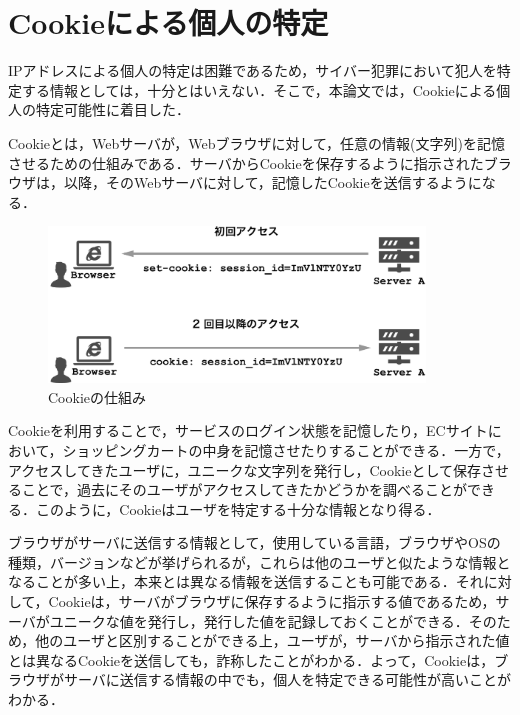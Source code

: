 \documentclass[10pt, a4paper]{jreport}
\begin{document}

\section{Cookieによる個人の特定}
IPアドレスによる個人の特定は困難であるため，サイバー犯罪において犯人を特定する情報としては，十分とはいえない．そこで，本論文では，Cookieによる個人の特定可能性に着目した．

Cookieとは，Webサーバが，Webブラウザに対して，任意の情報(文字列)を記憶させるための仕組みである．サーバからCookieを保存するように指示されたブラウザは，以降，そのWebサーバに対して，記憶したCookieを送信するようになる．

\begin{figure}[H]
	\begin{center}
		\includegraphics[width=100mm]{figures/cookie.pdf}
	\end{center}
	\caption{Cookieの仕組み}
	\label{fig: cookie}
\end{figure}

Cookieを利用することで，サービスのログイン状態を記憶したり，ECサイトにおいて，ショッピングカートの中身を記憶させたりすることができる．一方で，アクセスしてきたユーザに，ユニークな文字列を発行し，Cookieとして保存させることで，過去にそのユーザがアクセスしてきたかどうかを調べることができる．このように，Cookieはユーザを特定する十分な情報となり得る．

ブラウザがサーバに送信する情報として，使用している言語，ブラウザやOSの種類，バージョンなどが挙げられるが，これらは他のユーザと似たような情報となることが多い上，本来とは異なる情報を送信することも可能である．それに対して，Cookieは，サーバがブラウザに保存するように指示する値であるため，サーバがユニークな値を発行し，発行した値を記録しておくことができる．そのため，他のユーザと区別することができる上，ユーザが，サーバから指示された値とは異なるCookieを送信しても，詐称したことがわかる．よって，Cookieは，ブラウザがサーバに送信する情報の中でも，個人を特定できる可能性が高いことがわかる．
\end{document}
